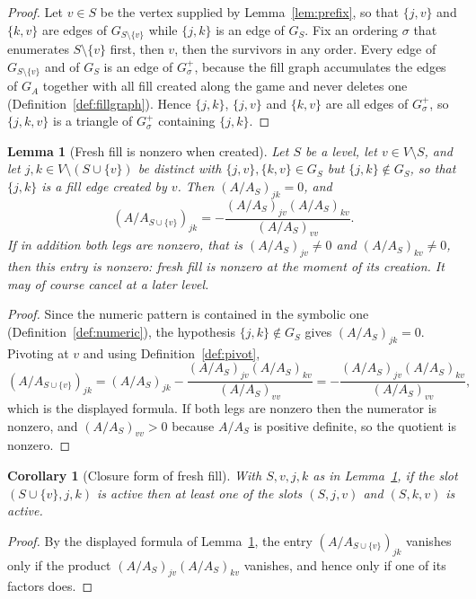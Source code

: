 \documentclass[11pt]{article}
\theoremstyle{plain}
\newtheorem{lemma}[theorem]{Lemma}
\newtheorem{corollary}[theorem]{Corollary}
\theoremstyle{definition}
\theoremstyle{remark}
\begin{document}
\begin{humanaiblock}
\begin{proof}
Let $v\in S$ be the vertex supplied by Lemma~\ref{lem:prefix}, so that $\{j,v\}$ and $\{k,v\}$ are
edges of $G_{S\setminus\{v\}}$ while $\{j,k\}$ is an edge of $G_S$. Fix an ordering $\sigma$ that
enumerates $S\setminus\{v\}$ first, then $v$, then the survivors in any order. Every edge of
$G_{S\setminus\{v\}}$ and of $G_S$ is an edge of $G^+_\sigma$, because the fill graph accumulates the
edges of $G_A$ together with all fill created along the game and never deletes one
(Definition~\ref{def:fillgraph}). Hence $\{j,k\}$, $\{j,v\}$ and $\{k,v\}$ are all edges of
$G^+_\sigma$, so $\{j,k,v\}$ is a triangle of $G^+_\sigma$ containing $\{j,k\}$.
\end{proof}

\begin{lemma}[Fresh fill is nonzero when created]\label{lem:fresh}
Let $S$ be a level, let $v\in V\setminus S$, and let $j,k\in V\setminus(S\cup\{v\})$ be distinct with
$\{j,v\},\{k,v\}\in G_S$ but $\{j,k\}\notin G_S$, so that $\{j,k\}$ is a fill edge created by $v$.
Then $(A/A_S)_{jk}=0$, and
\[
  (A/A_{S\cup\{v\}})_{jk}=-\frac{(A/A_S)_{jv}(A/A_S)_{kv}}{(A/A_S)_{vv}} .
\]
If in addition both legs are nonzero, that is $(A/A_S)_{jv}\neq0$ and $(A/A_S)_{kv}\neq0$, then this
entry is nonzero: fresh fill is nonzero at the moment of its creation. It may of course cancel at a
later level.
\end{lemma}

\begin{proof}
Since the numeric pattern is contained in the symbolic one (Definition~\ref{def:numeric}), the
hypothesis $\{j,k\}\notin G_S$ gives $(A/A_S)_{jk}=0$. Pivoting at $v$ and using
Definition~\ref{def:pivot},
\[
  (A/A_{S\cup\{v\}})_{jk}=(A/A_S)_{jk}-\frac{(A/A_S)_{jv}(A/A_S)_{kv}}{(A/A_S)_{vv}}
  =-\frac{(A/A_S)_{jv}(A/A_S)_{kv}}{(A/A_S)_{vv}},
\]
which is the displayed formula. If both legs are nonzero then the numerator is nonzero, and
$(A/A_S)_{vv}>0$ because $A/A_S$ is positive definite, so the quotient is nonzero.
\end{proof}

\begin{corollary}[Closure form of fresh fill]\label{cor:fresh-closure}
With $S,v,j,k$ as in Lemma~\ref{lem:fresh}, if the slot $(S\cup\{v\},j,k)$ is active then at least one
of the slots $(S,j,v)$ and $(S,k,v)$ is active.
\end{corollary}

\begin{proof}
By the displayed formula of Lemma~\ref{lem:fresh}, the entry $(A/A_{S\cup\{v\}})_{jk}$ vanishes only
if the product $(A/A_S)_{jv}(A/A_S)_{kv}$ vanishes, and hence only if one of its factors does.
\end{proof}


\end{humanaiblock}
\end{document}
